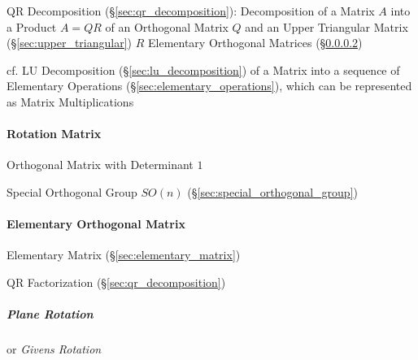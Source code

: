 QR Decomposition (\S\ref{sec:qr_decomposition}): Decomposition of a Matrix $A$
into a Product $A = QR$ of an Orthogonal Matrix $Q$ and an Upper Triangular
Matrix (\S\ref{sec:upper_triangular}) $R$ \fist Elementary Orthogonal Matrices
(\S\ref{sec:elementary_orthogonal_matrix})

cf. LU Decomposition (\S\ref{sec:lu_decomposition}) of a Matrix into a sequence
of Elementary Operations (\S\ref{sec:elementary_operations}), which can be
represented as Matrix Multiplications



\paragraph{Rotation Matrix}\label{sec:rotation_matrix}\hfill

Orthogonal Matrix with Determinant $1$

Special Orthogonal Group $SO(n)$ (\S\ref{sec:special_orthogonal_group})



\paragraph{Elementary Orthogonal Matrix}
\label{sec:elementary_orthogonal_matrix}\hfill

Elementary Matrix (\S\ref{sec:elementary_matrix})

QR Factorization (\S\ref{sec:qr_decomposition})



\subparagraph{Plane Rotation}\label{sec:plane_rotation}\hfill

or \emph{Givens Rotation}

